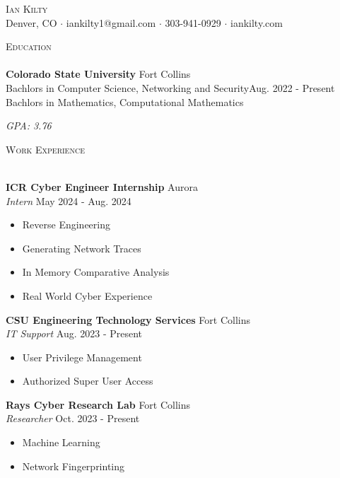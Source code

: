 \documentclass[a4paper]{article}
\newcommand{\lineunder} {
    \vspace*{-8pt} \\
    \hspace*{-18pt} \hrulefill \\
}
\newcommand{\header} [1] {
    {\hspace*{-18pt}\vspace*{6pt} \textsc{#1}}
    \vspace*{-6pt} \lineunder
}
\begin{document}
\vspace*{-40pt}

    

\vspace*{-10pt}
\begin{center}
	{\Huge \scshape {Ian Kilty}}\\
	Denver, CO $\cdot$ iankilty1@gmail.com $\cdot$ 303-941-0929 $\cdot$ iankilty.com\\
\end{center}

\header{Education}
\textbf{Colorado State University}
\hfill Fort Collins\\

Bachlors in Computer Science, Networking and Security\hfill Aug. 2022 - Present\\

Bachlors in Mathematics, Computational Mathematics

\textit{GPA: 3.76}
\vspace{2mm}

\header{Work Experience}
\vspace{1mm}

\textbf{ICR Cyber Engineer Internship} \hfill Aurora\\
\textit{Intern} \hfill May 2024 - Aug. 2024\\
\vspace{-1mm}
\begin{itemize} \itemsep 1pt
    \item Reverse Engineering
	\item Generating Network Traces
	\item In Memory Comparative Analysis
	\item Real World Cyber Experience 
\end{itemize}

\textbf{CSU Engineering Technology Services} \hfill Fort Collins\\
\textit{IT Support} \hfill Aug. 2023 - Present\\
\vspace{-1mm}
\begin{itemize} \itemsep 1pt
	\item User Privilege Management
	\item Authorized Super User Access
\end{itemize}

\textbf{Rays Cyber Research Lab} \hfill Fort Collins\\
\textit{Researcher} \hfill Oct. 2023 - Present\\
\vspace{-1mm}
\begin{itemize} \itemsep 1pt
	\item Machine Learning
	\item Network Fingerprinting
\end{itemize}
\end{document}

